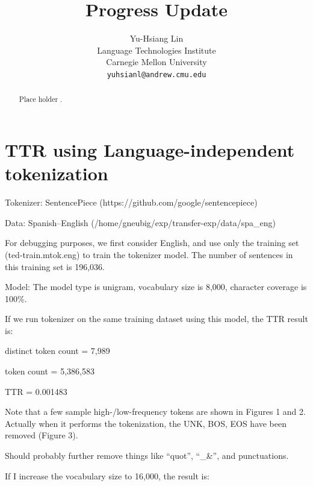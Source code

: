 \documentclass{article}
\title{Progress Update}
\author{
	Yu-Hsiang Lin
		\\
	Language Technologies Institute\\
	Carnegie Mellon University\\
	\texttt{yuhsianl@andrew.cmu.edu} \\
}
\begin{document}

\maketitle




\begin{abstract}

Place holder \cite{Adams2017}.

\end{abstract}



\section{TTR using Language-independent tokenization}

Tokenizer: SentencePiece (https://github.com/google/sentencepiece)

Data: Spanish--English (/home/gneubig/exp/transfer-exp/data/spa\_eng)

For debugging purposes, we first consider English, and use only the training set (ted-train.mtok.eng) to train the tokenizer model. The number of sentences in this training set is 196,036.

Model: The model type is unigram, vocabulary size is 8,000, character coverage is 100\%.

If we run tokenizer on the same training dataset using this model, the TTR result is:

distinct token count = 7,989

token count = 5,386,583

TTR = 0.001483

Note that a few sample high-/low-frequency tokens are shown in Figures 1 and 2. Actually when it performs the tokenization, the UNK, BOS, EOS have been removed (Figure 3).

Should probably further remove things like ``quot'', ``\_\&'', and punctuations.

If I increase the vocabulary size to 16,000, the result is:
\end{document}
